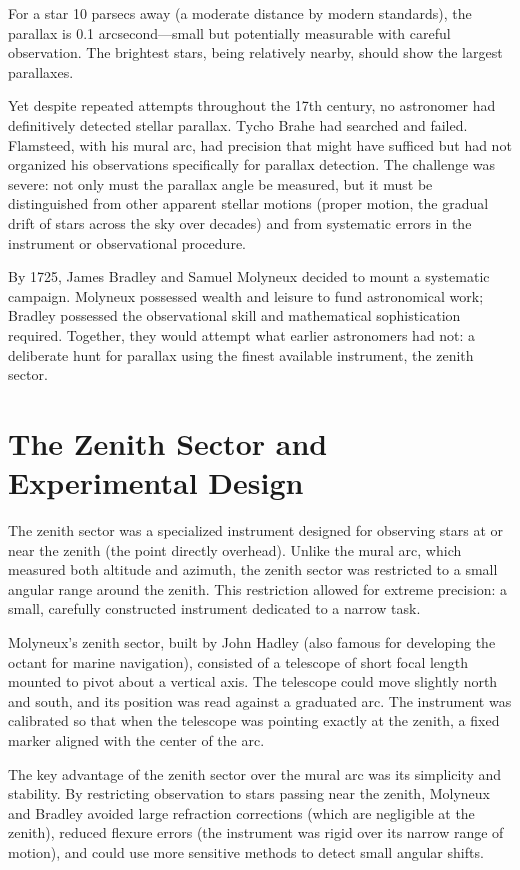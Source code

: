 For a star 10 parsecs away (a moderate distance by modern standards), the parallax is 0.1 arcsecond—small but potentially measurable with careful observation. The brightest stars, being relatively nearby, should show the largest parallaxes.

Yet despite repeated attempts throughout the 17th century, no astronomer had definitively detected stellar parallax. Tycho Brahe had searched and failed. Flamsteed, with his mural arc, had precision that might have sufficed but had not organized his observations specifically for parallax detection. The challenge was severe: not only must the parallax angle be measured, but it must be distinguished from other apparent stellar motions (proper motion, the gradual drift of stars across the sky over decades) and from systematic errors in the instrument or observational procedure.

By 1725, James Bradley and Samuel Molyneux decided to mount a systematic campaign. Molyneux possessed wealth and leisure to fund astronomical work; Bradley possessed the observational skill and mathematical sophistication required. Together, they would attempt what earlier astronomers had not: a deliberate hunt for parallax using the finest available instrument, the zenith sector.

\section{The Zenith Sector and Experimental Design}

The zenith sector was a specialized instrument designed for observing stars at or near the zenith (the point directly overhead). Unlike the mural arc, which measured both altitude and azimuth, the zenith sector was restricted to a small angular range around the zenith. This restriction allowed for extreme precision: a small, carefully constructed instrument dedicated to a narrow task.

Molyneux's zenith sector, built by John Hadley (also famous for developing the octant for marine navigation), consisted of a telescope of short focal length mounted to pivot about a vertical axis. The telescope could move slightly north and south, and its position was read against a graduated arc. The instrument was calibrated so that when the telescope was pointing exactly at the zenith, a fixed marker aligned with the center of the arc.

The key advantage of the zenith sector over the mural arc was its simplicity and stability. By restricting observation to stars passing near the zenith, Molyneux and Bradley avoided large refraction corrections (which are negligible at the zenith), reduced flexure errors (the instrument was rigid over its narrow range of motion), and could use more sensitive methods to detect small angular shifts.

